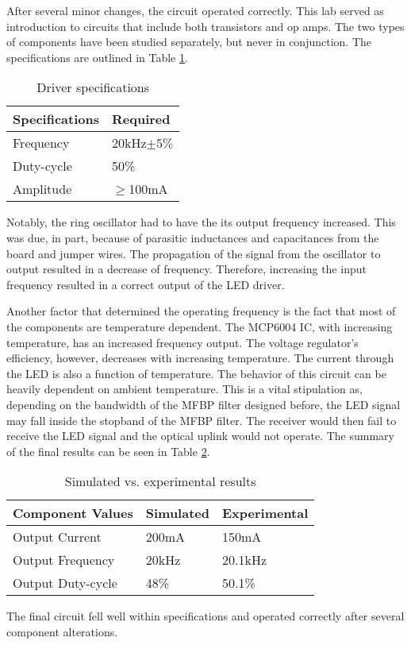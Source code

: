 
After several minor changes, the circuit operated correctly. This lab served as introduction to circuits that include both transistors and op amps. The two types of components have been studied separately, but never in conjunction. The specifications are outlined in Table \ref{tab:specs}.

\begin{table}[H]
	\centering
	\caption{Driver specifications}
	\label{tab:specs}
	\begin{tabular}{|l|l|}
		\hline
		Specifications & Required       \\ \hline
		Frequency      & 20kHz$\pm 5\%$ \\ \hline
		Duty-cycle     & 50\%           \\ \hline
		Amplitude      & $\geq$100mA    \\ \hline
	\end{tabular}
\end{table}

Notably, the ring oscillator had to have the its output frequency increased. This was due, in part, because of parasitic inductances and capacitances from the board and jumper wires. The propagation of the signal from the oscillator to output resulted in a decrease of frequency. Therefore, increasing the input frequency resulted in a correct output of the LED driver.

Another factor that determined the operating frequency is the fact that most of the components are temperature dependent. The MCP6004 IC, with increasing temperature, has an increased frequency output. The voltage regulator's efficiency, however, decreases with increasing temperature. The current through the LED is also a function of temperature. The behavior of this circuit can be heavily dependent on ambient temperature. This is a vital stipulation as, depending on the bandwidth of the MFBP filter designed before, the LED signal may fall inside the stopband of the MFBP filter. The receiver would then fail to receive the LED signal and the optical uplink would not operate. The summary of the final results can be seen in Table \ref{tab:simvsexp}.


\begin{table}[H]
	\centering
	\caption{Simulated vs. experimental results}
	\label{tab:simvsexp}
	\begin{tabular}{|l|l|l|}
		\hline
		Component Values  & Simulated & Experimental \\ \hline
		Output Current    & 200mA     & 150mA        \\ \hline
		Output Frequency  & 20kHz     & 20.1kHz      \\ \hline
		Output Duty-cycle & 48\%      & 50.1\%       \\ \hline
	\end{tabular}
\end{table}

The final circuit fell well within specifications and operated correctly after several component alterations.



